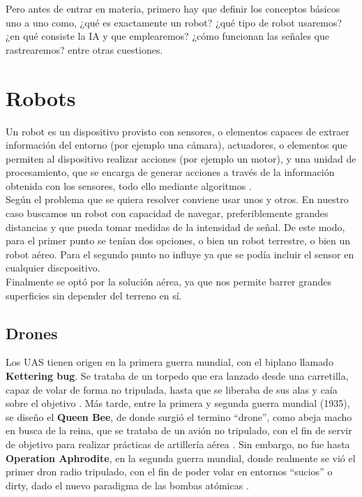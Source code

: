 Pero antes de entrar en materia, primero hay que definir los conceptos básicos uno a uno como, ¿qué es exactamente un robot? ¿qué tipo de robot usaremos? ¿en qué consiste la \ac{IA} y que emplearemos? ¿cómo funcionan las señales que rastrearemos? entre otras cuestiones.

\section{Robots}
\label{sec:robots}

Un robot es un dispositivo provisto con sensores, o elementos capaces de extraer información del entorno (por ejemplo una cámara), actuadores, o elementos que permiten al dispositivo realizar acciones (por ejemplo un motor), y una unidad de procesamiento, que se encarga de generar acciones a través de la información obtenida con los sensores, todo ello mediante algoritmos \cite{Wang2022}.\\

Según el problema que se quiera resolver conviene usar unos y otros. En nuestro caso buscamos un robot con capacidad de navegar, preferiblemente grandes distancias y que pueda tomar medidas de la intensidad de señal. De este modo, para el primer punto se tenían dos opciones, o bien un robot terrestre, o bien un robot aéreo. Para el segundo punto no influye ya que se podía incluir el sensor en cualquier discpositivo.\\

Finalmente se optó por la solución aérea, ya que nos permite barrer grandes superficies sin depender del terreno en sí.

\subsection{Drones}
\label{subsec:drones}

Los \ac{UAS} tienen origen en la primera guerra mundial, con el biplano llamado \textbf{Kettering bug}. Se trataba de un torpedo que era lanzado desde una carretilla, capaz de volar de forma no tripulada, hasta que se liberaba de sus alas y caía sobre el objetivo \cite{kettering-bug}. Más tarde, entre la primera y segunda guerra mundial (1935), se diseño el \textbf{Queen Bee}, de donde surgió el termino ``drone'', como abeja macho en busca de la reina, que se trataba de un avión no tripulado, con el fin de servir de objetivo para realizar prácticas de artillería aérea \cite{queen-bee}. Sin embargo, no fue hasta \textbf{Operation Aphrodite}, en la segunda guerra mundial, donde realmente se vió el primer dron radio tripulado, con el fin de poder volar en entornos ``sucios'' o dirty, dado el nuevo paradigma de las bombas atómicas \cite{operation-aphrodite}.\\

